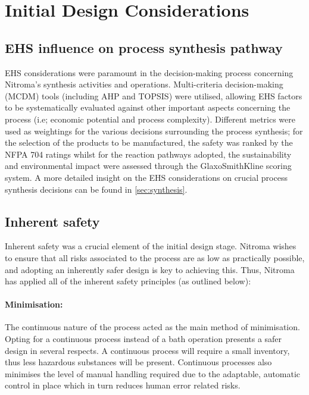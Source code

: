  
\section{Initial Design Considerations}

\subsection{EHS influence on process synthesis pathway}

EHS considerations were paramount in the decision-making process concerning Nitroma’s synthesis activities and operations. Multi-criteria decision-making (MCDM) tools (including AHP and TOPSIS) were utilised, allowing EHS factors to be systematically evaluated against other important aspects concerning the process (i.e; economic potential and process complexity). Different metrics were used as weightings for the various decisions surrounding the process synthesis; for the selection of the products to be manufactured, the safety was ranked by the NFPA 704 ratings whilst for the reaction pathways adopted, the sustainability and environmental impact were assessed through the GlaxoSmithKline scoring system. A more detailed insight on the EHS considerations on crucial process synthesis decisions can be found in \cref{sec:synthesis}. 

\subsection{Inherent safety}

Inherent safety was a crucial element of the initial design stage. Nitroma wishes to ensure that all risks associated to the process are as low as practically possible, and adopting an inherently safer design is key to achieving this. Thus, Nitroma has applied all of the inherent safety principles (as outlined below): 

\paragraph{Minimisation:} The continuous nature of the process acted as the main method of minimisation. Opting for a continuous process instead of a bath operation presents a safer design in several respects. A continuous process will require a small inventory, thus less hazardous substances will be present. Continuous processes also minimises the level of manual handling required due to the adaptable, automatic control in place which in turn reduces human error related risks. 


